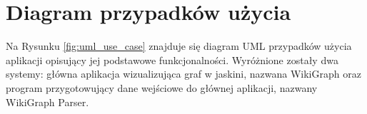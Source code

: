 \section{Diagram przypadków użycia}
Na Rysunku \ref{fig:uml_use_case} znajduje się diagram UML przypadków użycia aplikacji opisujący jej podstawowe funkcjonalności. Wyróżnione zostały dwa systemy: główna aplikacja wizualizująca graf w jaskini, nazwana WikiGraph oraz program przygotowujący dane wejściowe do głównej aplikacji, nazwany WikiGraph Parser.

